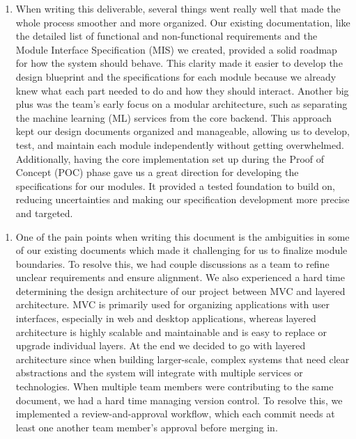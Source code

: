 \documentclass[12pt, titlepage]{article}
\begin{document}
\newpage

\begin{enumerate}
    \item When writing this deliverable, several things went really well that made the whole process smoother and more organized. Our existing documentation, like the detailed list of functional and non-functional requirements and the Module Interface Specification (MIS) we created, provided a solid roadmap for how the system should behave. This clarity made it easier to develop the design blueprint and the specifications for each module because we already knew what each part needed to do and how they should interact. Another big plus was the team’s early focus on a modular architecture, such as separating the machine learning (ML) services from the core backend. This approach kept our design documents organized and manageable, allowing us to develop, test, and maintain each module independently without getting overwhelmed. Additionally, having the core implementation set up during the Proof of Concept (POC) phase gave us a great direction for developing the specifications for our modules. It provided a tested foundation to build on, reducing uncertainties and making our specification development more precise and targeted.
\end{enumerate}

\begin{enumerate}
  \item One of the pain points when writing this document is the ambiguities in some of our existing documents which made it challenging for us to finalize module boundaries. To resolve this, we had couple discussions as a team to refine unclear requirements and ensure alignment. We also experienced a hard time determining the design architecture of our project between MVC and layered architecture. MVC is primarily used for organizing applications with user interfaces, especially in web and desktop applications, whereas layered architecture is highly scalable and maintainable and is easy to replace or upgrade individual layers. At the end we decided to go with layered architecture since when building larger-scale, complex systems that need clear abstractions and the system will integrate with multiple services or technologies. When multiple team members were contributing to the same document, we had a hard time managing version control. To resolve this, we implemented a review-and-approval workflow, which each commit needs at least one another team member’s approval before merging in.
\end{enumerate}
\end{document}
